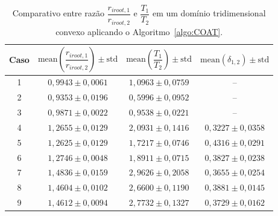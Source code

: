 \begin{table}[!htb]
  \centering
  \captiondelim{: }
  \caption{Comparativo entre razão $\dfrac{r_{iroot, 1}}{r_{iroot, 2}}$ e $\dfrac{T_1}{T_2}$ 
  em um domínio tridimensional convexo aplicando o Algoritmo~\ref{algo:COAT}.}
\begin{tabular}{|c|c|c|c|}
\hline
Caso & $\textrm{mean}\left(\dfrac{r_{iroot, 1}}{r_{iroot, 2}}\right)\pm \textrm{std}$ & $\textrm{mean}\left(\dfrac{T_1}{T_2}\right) \pm \textrm{std}$ & $\textrm{mean}\left(\delta_{1,2}\right) \pm \textrm{std}$ \\ \hline
1 & $0,9943 \pm 0,0061$ & $1,0963 \pm 0,0759$ & -- \\ \hline
2 & $0,9353 \pm 0,0196$ & $0,5996 \pm 0,0952$ & -- \\ \hline
3 & $0,9871 \pm 0,0022$ & $0,9538 \pm 0,0221$ & -- \\ \hline
4 & $1,2655 \pm 0,0129$ & $2,0931 \pm 0,1416$ & $0,3227 \pm 0,0358$ \\ \hline
5 & $1,2625 \pm 0,0129$ & $1,7217 \pm 0,0746$ & $0,4316 \pm 0,0291$ \\ \hline
6 & $1,2746 \pm 0,0048$ & $1,8911 \pm 0,0715$ & $0,3827 \pm 0,0238$ \\ \hline
7 & $1,4836 \pm 0,0159$ & $2,9626 \pm 0,2058$ & $0,3655 \pm 0,0254$ \\ \hline
8 & $1,4604 \pm 0,0102$ & $2,6600 \pm 0,1190$ & $0,3881 \pm 0,0145$ \\ \hline
9 & $1,4612 \pm 0,0094$ & $2,7732 \pm 0,1327$ & $0,3729 \pm 0,0162$ \\ \hline
\end{tabular}
  \label{tab:resultados-lei-alometrica-floresta-com-coeficiente-de-invasao-3arvores-3d-parte1}
\end{table}

